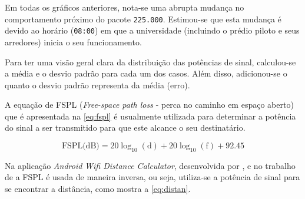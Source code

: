 Em todas os gráficos anteriores, nota-se uma abrupta mudança no comportamento
próximo do pacote \texttt{225.000}.
Estimou-se que esta mudança é devido ao horário (\texttt{08:00}) em que a universidade
(incluindo o prédio piloto e seus arredores) inicia o seu funcionamento.

Para ter uma visão geral clara da distribuição das potências de sinal, calculou-se
a média e o desvio padrão para cada um dos casos. Além disso, adicionou-se o
quanto o desvio padrão representa da média (erro).

\begin{table}[htb]
\end{table}


A equação de FSPL (\emph{Free-space path loss} - perca no caminho em
espaço aberto) que é apresentada na \autoref{eq:fspl} é usualmente utilizada para determinar a potência do sinal
a ser transmitido para que este alcance o seu destinatário.

\begin{equation}
	{\mbox{FSPL(dB)}}=20\log _{{10}}(\text{d})+20\log _{{10}}(\text{f})+92.45 \label{eq:fspl}
\end{equation}

Na aplicação \emph{Android} \emph{Wifi Distance Calculator}, desenvolvida por
, e no trabalho de  a FSPL é usada de maneira inversa, ou seja, utiliza-se a potência
de sinal para se encontrar a distância, como mostra a \autoref{eq:distan}.

